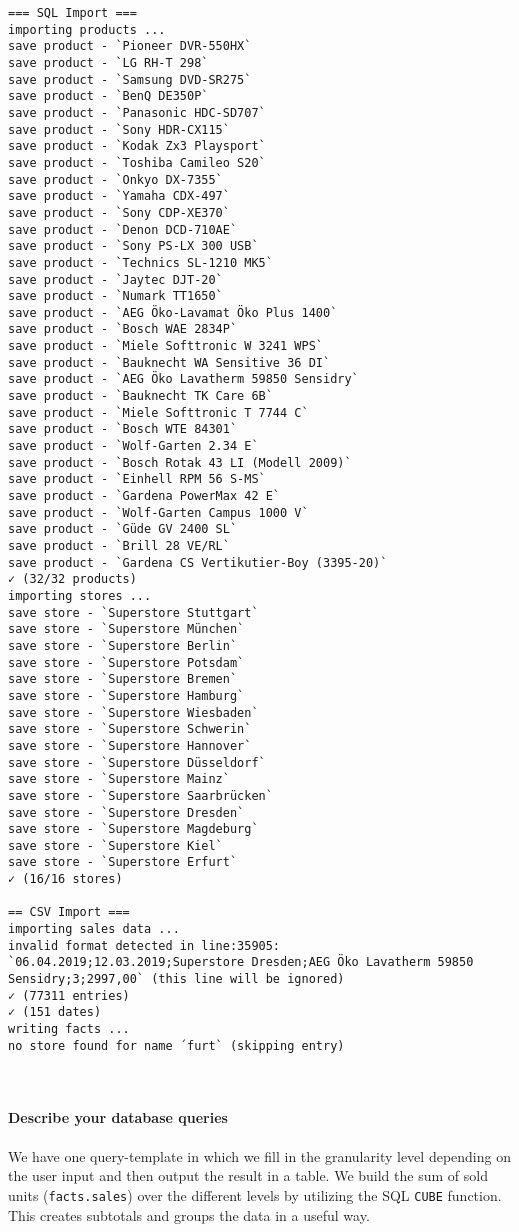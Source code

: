 \documentclass[a4paper,english,abstract=on]{scrartcl}
\begin{document}
\begin{lstlisting}
=== SQL Import ===
importing products ...
save product - `Pioneer DVR-550HX`
save product - `LG RH-T 298`
save product - `Samsung DVD-SR275`
save product - `BenQ DE350P`
save product - `Panasonic HDC-SD707`
save product - `Sony HDR-CX115`
save product - `Kodak Zx3 Playsport`
save product - `Toshiba Camileo S20`
save product - `Onkyo DX-7355`
save product - `Yamaha CDX-497`
save product - `Sony CDP-XE370`
save product - `Denon DCD-710AE`
save product - `Sony PS-LX 300 USB`
save product - `Technics SL-1210 MK5`
save product - `Jaytec DJT-20`
save product - `Numark TT1650`
save product - `AEG Öko-Lavamat Öko Plus 1400`
save product - `Bosch WAE 2834P`
save product - `Miele Softtronic W 3241 WPS`
save product - `Bauknecht WA Sensitive 36 DI`
save product - `AEG Öko Lavatherm 59850 Sensidry`
save product - `Bauknecht TK Care 6B`
save product - `Miele Softtronic T 7744 C`
save product - `Bosch WTE 84301`
save product - `Wolf-Garten 2.34 E`
save product - `Bosch Rotak 43 LI (Modell 2009)`
save product - `Einhell RPM 56 S-MS`
save product - `Gardena PowerMax 42 E`
save product - `Wolf-Garten Campus 1000 V`
save product - `Güde GV 2400 SL`
save product - `Brill 28 VE/RL`
save product - `Gardena CS Vertikutier-Boy (3395-20)`
✓ (32/32 products)
importing stores ...
save store - `Superstore Stuttgart`
save store - `Superstore München`
save store - `Superstore Berlin`
save store - `Superstore Potsdam`
save store - `Superstore Bremen`
save store - `Superstore Hamburg`
save store - `Superstore Wiesbaden`
save store - `Superstore Schwerin`
save store - `Superstore Hannover`
save store - `Superstore Düsseldorf`
save store - `Superstore Mainz`
save store - `Superstore Saarbrücken`
save store - `Superstore Dresden`
save store - `Superstore Magdeburg`
save store - `Superstore Kiel`
save store - `Superstore Erfurt`
✓ (16/16 stores)

== CSV Import ===
importing sales data ... 
invalid format detected in line:35905: `06.04.2019;12.03.2019;Superstore Dresden;AEG Öko Lavatherm 59850 Sensidry;3;2997,00` (this line will be ignored)
✓ (77311 entries)
✓ (151 dates)
writing facts ... 
no store found for name ´furt` (skipping entry)

\end{lstlisting}
~\\~\\
\textbf{Describe your database queries}
~\\~\\
We have one query-template in which we fill in the granularity level depending on the user input and then output the result in a table. We build the sum of sold units (\texttt{facts.sales}) over the different levels by utilizing the SQL \texttt{CUBE} function. This creates subtotals and groups the data in a useful way.
\end{document}
